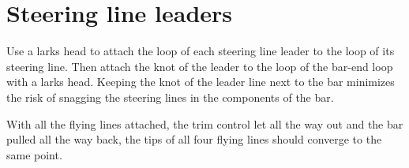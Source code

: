 \documentclass[
]{book}
\begin{document}
\hypertarget{steering-line-leaders}{%
\section{Steering line leaders}\label{steering-line-leaders}}

Use a larks head to attach the loop of each steering line leader to the loop of its steering line. Then attach the knot of the leader to the loop of the bar-end loop with a larks head. Keeping the knot of the leader line next to the bar minimizes the risk of snagging the steering lines in the components of the bar.

With all the flying lines attached, the trim control let all the way out and the bar pulled all the way back, the tips of all four flying lines should converge to the same point.

  
\end{document}
